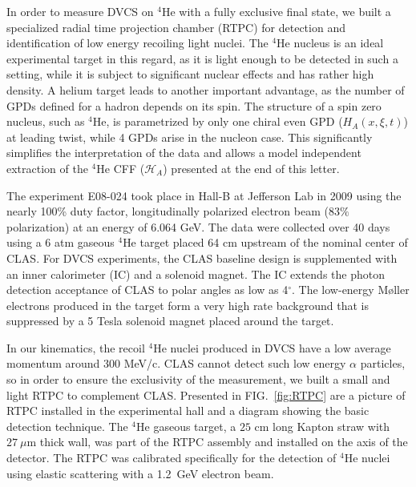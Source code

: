 \documentclass[twocolumn,nofootinbib,showpacs,prl,superscriptaddress,secnumarabic,amssymb,nobibnotes,aps,floatfix]{revtex4}
\begin{document}
In order to measure DVCS on $^4$He with a fully exclusive final state, we built 
a specialized radial time projection chamber (RTPC) for detection and 
identification of low energy recoiling light nuclei. The $^4$He nucleus is an 
ideal experimental target in this regard, as it is light enough to be detected 
in such a setting, while it is subject to significant nuclear effects 
\cite{JSeely} and has rather high density. A helium target leads to another 
important advantage, as the number of GPDs defined for a hadron depends on its 
spin. The structure of a spin zero nucleus, such as $^4$He, is parametrized by 
only one chiral even GPD ($H_{A}(x,\xi,t)$) at leading twist, while 4 GPDs 
arise in the nucleon case. This significantly simplifies the interpretation of 
the data and allows a model independent extraction of the $^4$He CFF 
($\mathcal{H}_{A}$) presented at the end of this letter. 


The experiment E08-024 took place in Hall-B at Jefferson Lab in 2009 using the 
nearly 100\% duty factor, longitudinally polarized electron beam (83$\%$ 
polarization) at an energy of 6.064 GeV. The data were collected over 40 days 
using a 6 atm gaseous $^4$He target placed 64 cm upstream of the nominal center 
of CLAS. For DVCS experiments, the CLAS baseline design \cite{Mecking:2003zu} 
is supplemented with an inner calorimeter (IC) and a solenoid magnet. The IC 
extends the photon detection acceptance of CLAS to polar angles as low as 
4$^{\circ}$. The low-energy M\o{}ller electrons produced in the target form a 
very high rate background that is suppressed by a 5 Tesla solenoid magnet 
placed around the target. 

In our kinematics, the recoil $^4$He nuclei produced in DVCS have a low average 
momentum around 300 MeV/c. CLAS cannot detect such low energy $\alpha$ 
particles, so in order to ensure the exclusivity of the measurement, we built a 
small and light RTPC to complement CLAS. Presented in FIG.~\ref{fig:RTPC} are a 
picture of RTPC installed in the experimental hall and a diagram showing the 
basic detection technique. The $^4$He gaseous target, a $25$ cm long Kapton 
straw with $27~\mu$m thick wall, was part of the RTPC assembly and installed on 
the axis of the detector. The RTPC was calibrated specifically for the 
detection of $^4$He nuclei using elastic scattering with a 1.2~GeV electron 
beam.
\end{document}
